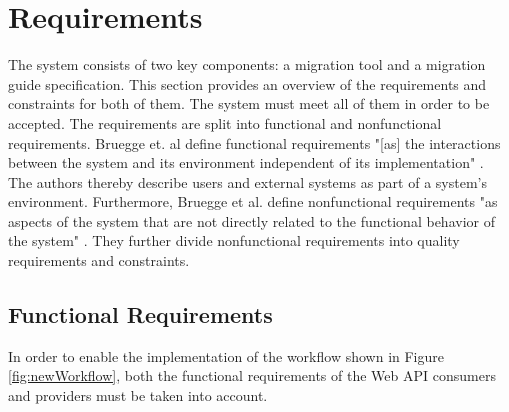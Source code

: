 \section{Requirements}
\label{sec:Requirements}

The system consists of two key components: a migration tool and a migration guide specification. This section provides an overview of the requirements and constraints for both of them. The system must meet all of them in order to be accepted. The requirements are split into functional and nonfunctional requirements. Bruegge et. al define functional requirements "[as] the interactions between the system and its environment independent of its implementation" \cite{bruegge_object-oriented_2010}. The authors thereby describe users and external systems as part of a system's environment. Furthermore, Bruegge et al. define nonfunctional requirements "as aspects of the system that are not directly related to the functional behavior of the system" \cite{bruegge_object-oriented_2010}. They further divide nonfunctional requirements into quality requirements and constraints. 

\subsection{Functional Requirements}
\label{subsec:FunctionalRequirements}
 
 In order to enable the implementation of the workflow shown in Figure \ref{fig:newWorkflow}, both the functional requirements of the Web API consumers and providers must be taken into account. 

